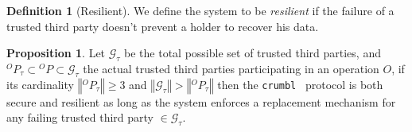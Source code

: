 \documentclass[twoside,twocolumn]{article}
\newcommand{\norm}[1]{\left\Vert#1\right\Vert}
\theoremstyle{definition}
\newtheorem{definition}{Definition}
\newtheorem{proposition}{Proposition}
\theoremstyle{remark}
\begin{document}
\begin{definition}[Resilient]
    \label{resilient}
    We define the system to be \emph{resilient} if the failure of a trusted third party doesn't prevent a holder to recover his data.
\end{definition}

\begin{proposition}
    \label{prop:ttp3}
    Let $\mathcal{G}_\tau$ be the total possible set of trusted third parties, and ${}^OP_\tau \subset {}^OP \subset \mathcal{G}_\tau$ the actual 
    trusted third parties participating in an operation $O$, if its cardinality $\norm{{}^OP_\tau} \geq 3$ and $\norm{\mathcal{G}_\tau} > \norm{{}^OP_\tau}$ then the 
    \texttt{crumbl}\texttrademark~ protocol is both secure and resilient as long as the system enforces a replacement mechanism for any failing trusted 
    third party $\in \mathcal{G}_\tau$.
\end{proposition}
\end{document}
